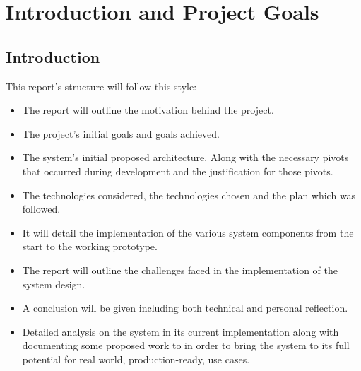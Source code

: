 \chapter{Introduction and Project Goals}
\label{chap:intro}

\section{Introduction}
This report's structure will follow this style:
\begin{itemize}
	\item The report will outline the motivation behind the project.
	\item The project's initial goals and goals achieved.
	\item The system's initial proposed architecture. Along with the necessary pivots
	      that occurred during development and the justification for those pivots.
	\item The technologies considered, the technologies chosen and the plan which was followed.
	\item It will detail the implementation of the various system components from the start to the working prototype.
	\item The report will outline the challenges faced in the implementation of the system design.
	\item A conclusion will be given including both technical and personal reflection.
	\item Detailed analysis on the system in its current implementation along with
	      documenting some proposed work to in order to bring the system to its full potential for
	      real world, production-ready, use cases.
\end{itemize}
